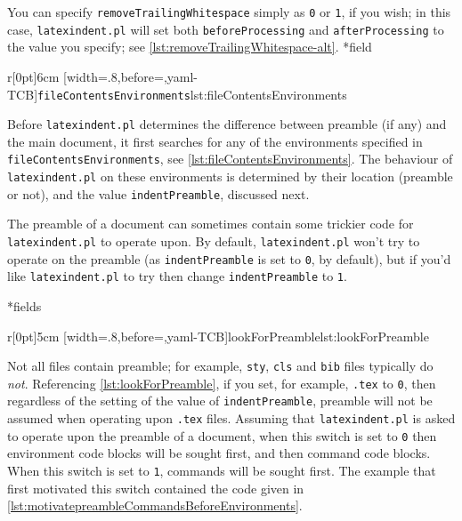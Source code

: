 	You can specify \texttt{removeTrailingWhitespace} simply as \texttt{0} or \texttt{1}, if you wish; in this case,
	\texttt{latexindent.pl} will set both \texttt{beforeProcessing} and \texttt{afterProcessing} to the value you specify;
	see \cref{lst:removeTrailingWhitespace-alt}.
*{field}

	\begin{wrapfigure}[6]{r}[0pt]{6cm}
		[width=.8\linewidth,before=\centering,yaml-TCB]{\texttt{fileContentsEnvironments}}{lst:fileContentsEnvironments}
	\end{wrapfigure}
	Before \texttt{latexindent.pl} determines the difference between preamble (if any) and the main document,
	it first searches for any of the environments specified in \texttt{fileContentsEnvironments}, see
	\cref{lst:fileContentsEnvironments}.
	The behaviour of \texttt{latexindent.pl} on these environments is determined by their location (preamble or not), and
	the value \texttt{indentPreamble}, discussed next.


	The preamble of a document can sometimes contain some trickier code
	for \texttt{latexindent.pl} to operate upon. By default, \texttt{latexindent.pl}
	won't try to operate on the preamble (as \texttt{indentPreamble} is set to \texttt{0},
	by default), but if you'd like \texttt{latexindent.pl} to try then change \texttt{indentPreamble} to \texttt{1}.

*{fields}

	\begin{wrapfigure}[8]{r}[0pt]{5cm}
		[width=.8\linewidth,before=\centering,yaml-TCB]{lookForPreamble}{lst:lookForPreamble}
	\end{wrapfigure}
	Not all files contain preamble; for example, \texttt{sty}, \texttt{cls} and \texttt{bib} files typically do \emph{not}. Referencing
	\cref{lst:lookForPreamble}, if you set, for example, \texttt{.tex} to \texttt{0}, then regardless of the setting of the value of \texttt{indentPreamble}, preamble
	will not be assumed when operating upon \texttt{.tex} files.
	Assuming that \texttt{latexindent.pl} is asked to operate upon the preamble of a document,
	when this switch is set to \texttt{0} then environment code blocks will be sought first,
	and then command code blocks. When this switch is set to \texttt{1}, commands
	will be sought first. The example that first motivated this switch contained the code given in \cref{lst:motivatepreambleCommandsBeforeEnvironments}.

